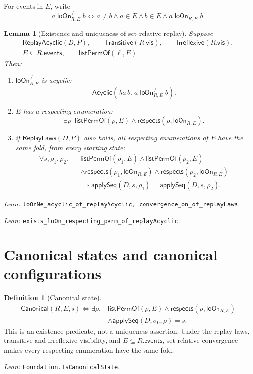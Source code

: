 \documentclass[11pt]{article}
\newtheorem{lemma}[theorem]{Lemma}
\theoremstyle{definition}
\newtheorem{definition}[theorem]{Definition}
\newcommand{\init}{\sigma_0}
\newcommand{\applySeq}{\mathsf{applySeq}}
\newcommand{\loOn}{\mathsf{loOn}}
\newcommand{\Can}{\mathsf{Canonical}}
\newcommand{\src}[2]{\href{../../#1}{\texttt{#2}}}
\newcommand{\anchor}[2]{\par\smallskip\noindent\emph{Lean: }\src{#1}{#2}.}
\begin{document}
For events in $E$, write
\[
 a\;\loOn^{\ne}_{R,E}\;b
 \Longleftrightarrow
 a\ne b\land a\in E\land b\in E\land a\;\loOn_{R,E}\;b.
\]
\begin{lemma}[Existence and uniqueness of set-relative replay]
\label{lem:set-relative-replay}
Suppose
\[
\begin{gathered}
 \mathsf{ReplayAcyclic}(D,P),\qquad
 \mathsf{Transitive}(R.\mathsf{vis}),\qquad
 \mathsf{Irreflexive}(R.\mathsf{vis}),\\
 E\subseteq R.\mathsf{events},\qquad
 \mathsf{listPermOf}(\ell,E).
\end{gathered}
\]
Then:
\begin{enumerate}
\item $\loOn^{\ne}_{R,E}$ is acyclic:
\[
 \mathsf{Acyclic}
   (\lambda a\,b.\;a\;\loOn^{\ne}_{R,E}\;b).
\]
\item $E$ has a respecting enumeration:
\[
 \exists\rho.\;
 \mathsf{listPermOf}(\rho,E)\land
 \mathsf{respects}(\rho,\loOn_{R,E}).
\]
\item if $\mathsf{ReplayLaws}(D,P)$ also holds, all respecting enumerations
of $E$ have the same fold, from every starting state:
\[
\begin{aligned}
 \forall s,\rho_1,\rho_2.\quad
 &\mathsf{listPermOf}(\rho_1,E)
 \land\mathsf{listPermOf}(\rho_2,E)\\
 &\land\mathsf{respects}(\rho_1,\loOn_{R,E})
 \land\mathsf{respects}(\rho_2,\loOn_{R,E})\\
 &\Longrightarrow
 \applySeq(D,s,\rho_1)=\applySeq(D,s,\rho_2).
\end{aligned}
\]
\end{enumerate}
\end{lemma}

\anchor{Sal/MRDTs/Framework/ReplayLaws.lean}
  {loOnNe\_acyclic\_of\_replayAcyclic, convergence\_on\_of\_replayLaws}
\anchor{Sal/MRDTs/Metatheory/Correctness.lean}
  {exists\_loOn\_respecting\_perm\_of\_replayAcyclic}

\section{Canonical states and canonical configurations}
\label{sec:canonical}

\begin{definition}[Canonical state]
\[
\begin{aligned}
 \Can(R,E,s)\Longleftrightarrow\exists\rho.\;&
 \mathsf{listPermOf}(\rho,E)\land
 \mathsf{respects}(\rho,\loOn_{R,E})\\
 &\land\applySeq(D,\init,\rho)=s.
\end{aligned}
\]
This is an existence predicate, not a uniqueness assertion. Under the replay
laws, transitive and irreflexive visibility, and $E\subseteq R.\mathsf{events}$,
set-relative convergence makes every respecting enumeration have the same
fold.
\anchor{Sal/MRDTs/Metatheory/Join/SetRelativeReplay.lean}
  {Foundation.IsCanonicalState}
\end{definition}
\end{document}
